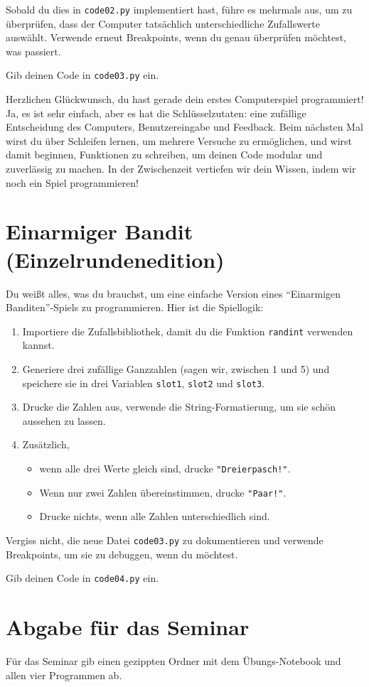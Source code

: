 \documentclass[
]{book}
\providecommand{\tightlist}{%
  \setlength{\itemsep}{0pt}\setlength{\parskip}{0pt}}
\begin{document}
Sobald du dies in \texttt{code02.py} implementiert hast, führe es mehrmals aus, um zu überprüfen, dass der Computer tatsächlich unterschiedliche Zufallswerte auswählt. Verwende erneut Breakpoints, wenn du genau überprüfen möchtest, was passiert.

Gib deinen Code in \texttt{code03.py} ein.

Herzlichen Glückwunsch, du hast gerade dein erstes Computerspiel programmiert! Ja, es ist sehr einfach, aber es hat die Schlüsselzutaten: eine zufällige Entscheidung des Computers, Benutzereingabe und Feedback. Beim nächsten Mal wirst du über Schleifen lernen, um mehrere Versuche zu ermöglichen, und wirst damit beginnen, Funktionen zu schreiben, um deinen Code modular und zuverlässig zu machen. In der Zwischenzeit vertiefen wir dein Wissen, indem wir noch ein Spiel programmieren!

\hypertarget{einarmiger-bandit-einzelrundenedition}{%
\section{Einarmiger Bandit (Einzelrundenedition)}\label{einarmiger-bandit-einzelrundenedition}}

Du weißt alles, was du brauchst, um eine einfache Version eines ``Einarmigen Banditen''-Spiels zu programmieren. Hier ist die Spiellogik:

\begin{enumerate}
\def\labelenumi{\arabic{enumi}.}
\tightlist
\item
  Importiere die Zufallsbibliothek, damit du die Funktion \texttt{randint} verwenden kannst.
\item
  Generiere drei zufällige Ganzzahlen (sagen wir, zwischen 1 und 5) und speichere sie in drei Variablen \texttt{slot1}, \texttt{slot2} und \texttt{slot3}.
\item
  Drucke die Zahlen aus, verwende die String-Formatierung, um sie schön aussehen zu lassen.
\item
  Zusätzlich,

  \begin{itemize}
  \tightlist
  \item
    wenn alle drei Werte gleich sind, drucke \texttt{"Dreierpasch!"}.
  \item
    Wenn nur zwei Zahlen übereinstimmen, drucke \texttt{"Paar!"}.
  \item
    Drucke nichts, wenn alle Zahlen unterschiedlich sind.
  \end{itemize}
\end{enumerate}

Vergiss nicht, die neue Datei \texttt{code03.py} zu dokumentieren und verwende Breakpoints, um sie zu debuggen, wenn du möchtest.

Gib deinen Code in \texttt{code04.py} ein.

\hypertarget{abgabe-fuxfcr-das-seminar}{%
\section{Abgabe für das Seminar}\label{abgabe-fuxfcr-das-seminar}}

Für das Seminar gib einen gezippten Ordner mit dem Übungs-Notebook und allen vier Programmen ab.

  
\end{document}
